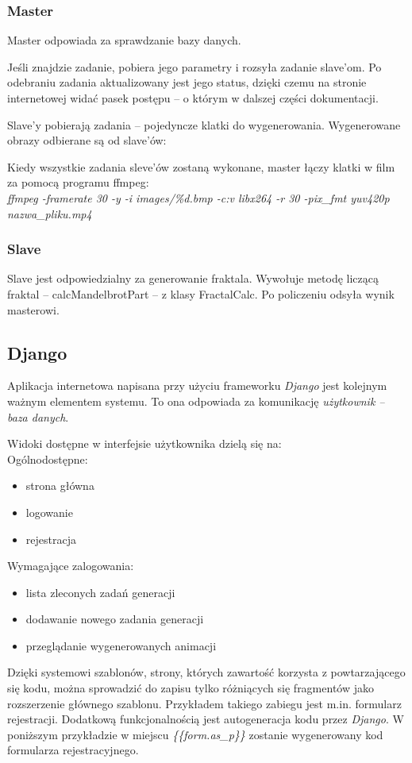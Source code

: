 \documentclass[a4paper]{article}
\begin{document}
\subsubsection{Master}
Master odpowiada za sprawdzanie bazy danych. 

Jeśli znajdzie zadanie, pobiera jego parametry i rozsyła zadanie slave'om. Po odebraniu zadania aktualizowany jest jego status, dzięki czemu na stronie internetowej widać pasek postępu -- o którym w dalszej części dokumentacji.

Slave'y pobierają zadania -- pojedyncze klatki do wygenerowania. Wygenerowane obrazy odbierane są od slave'ów:

Kiedy wszystkie zadania sleve'ów zostaną wykonane, master łączy klatki w film za pomocą programu ffmpeg:\\
\textit{ffmpeg -framerate 30 -y -i images/\%d.bmp -c:v libx264 -r 30 -pix\_fmt yuv420p nazwa\_pliku.mp4}

\subsubsection{Slave}
Slave jest odpowiedzialny za generowanie fraktala. Wywołuje metodę liczącą fraktal -- calcMandelbrotPart -- z klasy FractalCalc. Po policzeniu odsyła wynik masterowi.

\subsection{Django}
Aplikacja internetowa napisana przy użyciu frameworku \textit{Django} jest kolejnym ważnym elementem systemu. To ona odpowiada za komunikację \textit{użytkownik -- baza danych}.

Widoki dostępne w interfejsie użytkownika dzielą się na:\\
Ogólnodostępne:
\begin{itemize}
\item strona główna
\item logowanie
\item rejestracja
\end{itemize}
Wymagające zalogowania:
\begin{itemize}
\item lista zleconych zadań generacji
\item dodawanie nowego zadania generacji
\item przeglądanie wygenerowanych animacji
\end{itemize}

Dzięki systemowi szablonów, strony, których zawartość korzysta z powtarzającego się kodu, można sprowadzić do zapisu tylko różniących się fragmentów jako rozszerzenie głównego szablonu. Przykładem takiego zabiegu jest m.in. formularz rejestracji. Dodatkową funkcjonalnością jest autogeneracja kodu przez \textit{Django}. W poniższym przykładzie w miejscu \textit{\{\{form.as\_p\}\}} zostanie wygenerowany kod formularza rejestracyjnego.
\end{document}
